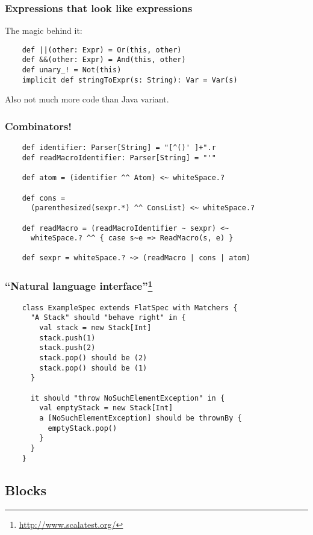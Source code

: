 \documentclass{beamer}
\begin{document}
\begin{frame}[containsverbatim]
  \lstset{gobble=4}
  \frametitle{Expressions that look like expressions}
  
  The magic behind it:
  \begin{lstlisting}
    def ||(other: Expr) = Or(this, other)
    def &&(other: Expr) = And(this, other)
    def unary_! = Not(this)
    implicit def stringToExpr(s: String): Var = Var(s)
  \end{lstlisting}
  Also not much more code than Java variant.
\end{frame}

\begin{frame}[containsverbatim]
  \lstset{gobble=4}
  \frametitle{Combinators!}
  \begin{lstlisting}
    def identifier: Parser[String] = "[^()' ]+".r
    def readMacroIdentifier: Parser[String] = "'"

    def atom = (identifier ^^ Atom) <~ whiteSpace.?

    def cons =  
      (parenthesized(sexpr.*) ^^ ConsList) <~ whiteSpace.?

    def readMacro = (readMacroIdentifier ~ sexpr) <~ 
      whiteSpace.? ^^ { case s~e => ReadMacro(s, e) }

    def sexpr = whiteSpace.? ~> (readMacro | cons | atom)
  \end{lstlisting}
\end{frame}

\begin{frame}[containsverbatim]
  \lstset{gobble=4} \frametitle{\enquote{Natural language
      interface}\footnote{\scriptsize\protect\url{http://www.scalatest.org/}}}
  \begin{lstlisting}
    class ExampleSpec extends FlatSpec with Matchers {
      "A Stack" should "behave right" in {
        val stack = new Stack[Int]
        stack.push(1)
        stack.push(2)
        stack.pop() should be (2)
        stack.pop() should be (1)
      }

      it should "throw NoSuchElementException" in {
        val emptyStack = new Stack[Int]
        a [NoSuchElementException] should be thrownBy {
          emptyStack.pop()
        } 
      }
    }
  \end{lstlisting}
\end{frame}


\subsection{Blocks}
\end{document}
